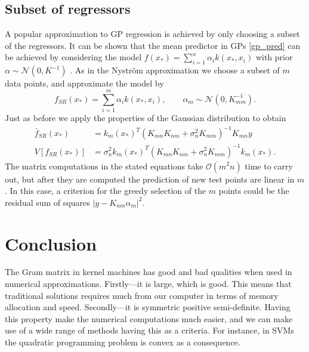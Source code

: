 \documentclass{article}
\theoremstyle{plain}
\theoremstyle{definition}
\theoremstyle{remark}
\begin{document}
\subsection{Subset of regressors}
A popular approximation to GP regression is achieved by only choosing a subset of the regressors.
It can be shown that the mean predictor in GPs \ref{gp_pred} can be achieved by considering the model $f(x_*) = \sum_{i = 1}^{n}\alpha_i k(x_*, x_i)$ with prior $\alpha \sim \mathcal{N}(0, K^{-1})$ \cite{rasmussen}.
As in the Nyström approximation we choose a subset of $m$ data points, and approximate the model by
\begin{equation*}
        f_{SR}(x_*) = \sum_{ i = 1}^{m}\alpha_i k(x_*, x_i), \quad \quad \alpha_m \sim \mathcal{N}(0, K_{mm}^{-1}).
\end{equation*}
Just as before we apply the properties of the Gaussian distribution to obtain
\begin{align*}
        \bar{f}_{SR}(x_*) &= k_m (x_*)^T (K_{mn}K_{nm} + \sigma_n^2 K_{mm})^{-1}K_{mn}y \\
        V[f_{SR}(x_*)] &= \sigma_n^2 k_m (x_*)^T(K_{mn}K_{nm} + \sigma_n^2 K_{mm})^{-1} k_m(x_*).
\end{align*}
The matrix computations in the stated equations take $\mathcal{O}(m^2n)$ time to carry out, but after they are computed the prediction of new test points are linear in $m$.
In this case, a criterion for the greedy selection of the $m$ points could be the residual sum of squares $|y - K_{nm}\alpha_m|^2$.



\section{Conclusion}
The Gram matrix in kernel machines has good and bad qualities when used in numerical approximations.
Firstly—it is large, which is good.
This means that traditional solutions requires much from our computer in terms of memory allocation and speed.
Secondly—it is symmetric positive semi-definite.
Having this property make the numerical computations much easier, and we can make use of a wide range of methods having this as a criteria.
For instance, in SVMs the quadratic programming problem is convex as a consequence.
\end{document}
